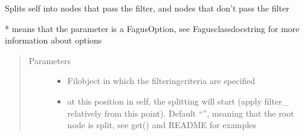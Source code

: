 \documentclass[a4paper,10pt,english]{sphinxmanual}
\begin{document}
\begin{fulllineitems}
\begin{fulllineitems}
\label{\detokenize{fagus:fagus.Fagus.split}}
\pysigstartsignatures
{}
\pysigstopsignatures
\sphinxAtStartPar
Splits self into nodes that pass the filter, and nodes that don’t pass the filter

\sphinxAtStartPar
* means that the parameter is a FagusOption, see Fagus\sphinxhyphen{}class\sphinxhyphen{}docstring for more information about options
\begin{quote}\begin{description}
\item[{Parameters}] \leavevmode\begin{itemize}
\item {}
\sphinxAtStartPar
{} \textendash{} Fil\sphinxhyphen{}object in which the filtering\sphinxhyphen{}criteria are specified

\item {}
\sphinxAtStartPar
{} \textendash{} at this position in self, the splitting will start (apply filter\_ relatively from this point).
Default “”, meaning that the root node is split, see get() and README for examples


\end{itemize}
\end{description}
\end{quote}
\end{fulllineitems}
\end{fulllineitems}
\end{document}
